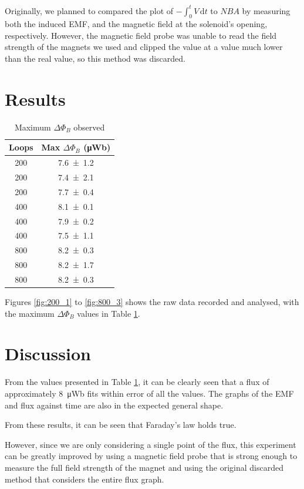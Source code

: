 \documentclass[a4paper]{scrartcl}
\begin{document}
Originally, we planned to compared the plot of \(-\int_0^t V \,\mathrm{d}t\) to \(N B A\) by measuring both the induced EMF, and the magnetic field at the solenoid's opening, respectively. However, the magnetic field probe was unable to read the field strength of the magnets we used and clipped the value at a value much lower than the real value, so this method was discarded.

\section{Results}
\begin{table}
    \centering
    \begin{tabular}{c | c}
        Loops & Max \(\Delta\Phi_B\) (\si{\micro\weber}) \\
        \hline
        200 & \SI{7.6 \pm 1.2}{} \\
        200 & \SI{7.4 \pm 2.1}{} \\
        200 & \SI{7.7 \pm 0.4}{} \\
        400 & \SI{8.1 \pm 0.1}{} \\
        400 & \SI{7.9 \pm 0.2}{} \\
        400 & \SI{7.5 \pm 1.1}{} \\
        800 & \SI{8.2 \pm 0.3}{} \\
        800 & \SI{8.2 \pm 1.7}{} \\
        800 & \SI{8.2 \pm 0.3}{} \\
        \hline
    \end{tabular}
    \caption{Maximum \(\Delta\Phi_B\) observed}
    \label{tab:max_phi}
\end{table}

Figures \ref{fig:200_1} to \ref{fig:800_3} shows the raw data recorded and analysed, with the maximum \(\Delta\Phi_B\) values in Table \ref{tab:max_phi}.

\section{Discussion}
From the values presented in Table \ref{tab:max_phi}, it can be clearly seen that a flux of approximately \SI{8}{\micro\weber} fits within error of all the values. The graphs of the EMF and flux against time are also in the expected general shape.

From these results, it can be seen that Faraday's law holds true.

However, since we are only considering a single point of the flux, this experiment can be greatly improved by using a magnetic field probe that is strong enough to measure the full field strength of the magnet and using the original discarded method that considers the entire flux graph.
\end{document}
